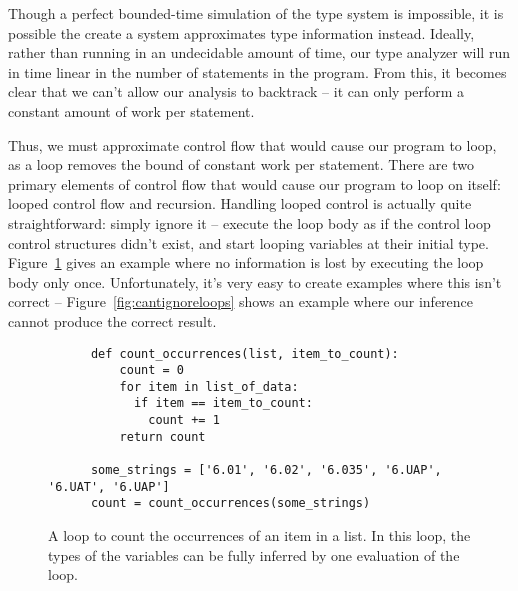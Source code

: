 \documentclass{article}[12pt]
\begin{document}
Though a perfect bounded-time simulation of the type system is impossible, it is possible the create
a system approximates type information instead. Ideally, rather than running in an undecidable
amount of time, our type analyzer will run in time linear in the number of statements in the
program. From this, it becomes clear that we can't allow our analysis to backtrack -- it can only
perform a constant amount of work per statement. 

Thus, we must approximate control flow that would cause our program to loop, as a loop removes the
bound of constant work per statement. There are two primary elements of control flow that would
cause our program to loop on itself: looped control flow and recursion. Handling looped control is
actually quite straightforward: simply ignore it -- execute the loop body as if the control loop
control structures didn't exist, and start looping variables at their initial type.
Figure~\ref{fig:ignoreloops} gives an example where no information is lost by executing the loop
body only once. Unfortunately, it's very easy to create examples where this isn't correct --
Figure~\ref{fig:cantignoreloops} shows an example where our inference cannot produce the correct
result.

\begin{figure}
    \begin{verbatim}
      def count_occurrences(list, item_to_count):
          count = 0
          for item in list_of_data:
            if item == item_to_count: 
              count += 1
          return count
      
      some_strings = ['6.01', '6.02', '6.035', '6.UAP', '6.UAT', '6.UAP']
      count = count_occurrences(some_strings)

  \end{verbatim}
  \caption{A loop to count the occurrences of an item in a list. In this loop, the types of the
      variables can be fully inferred by one evaluation of the loop.
  }
  \label{fig:ignoreloops}
\end{figure}
\end{document}
